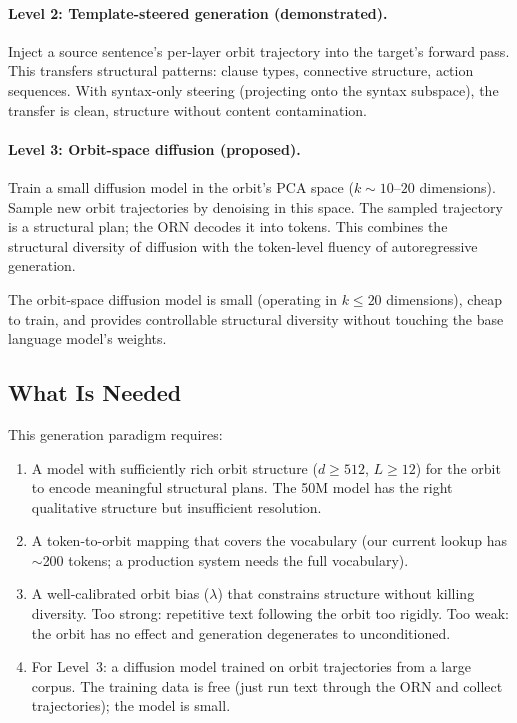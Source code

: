 \documentclass[11pt, a4paper]{article}
\theoremstyle{plain}
\theoremstyle{definition}
\theoremstyle{remark}
\begin{document}
\paragraph{Level 2: Template-steered generation (demonstrated).}
Inject a source sentence's per-layer orbit trajectory into the target's forward pass.
This transfers structural patterns: clause types, connective structure, action sequences.
With syntax-only steering (projecting onto the syntax subspace), the transfer is clean, structure without content contamination.

\paragraph{Level 3: Orbit-space diffusion (proposed).}
Train a small diffusion model in the orbit's PCA space ($k \sim 10$--$20$ dimensions).
Sample new orbit trajectories by denoising in this space.
The sampled trajectory is a structural plan; the ORN decodes it into tokens.
This combines the structural diversity of diffusion with the token-level fluency of autoregressive generation.

The orbit-space diffusion model is small (operating in $k \leq 20$ dimensions), cheap to train, and provides controllable structural diversity without touching the base language model's weights.

\subsection{What Is Needed}

This generation paradigm requires:
\begin{enumerate}[nosep]
\item A model with sufficiently rich orbit structure ($d \geq 512$, $L \geq 12$) for the orbit to encode meaningful structural plans.
    The 50M model has the right qualitative structure but insufficient resolution.
\item A token-to-orbit mapping that covers the vocabulary (our current lookup has $\sim$200 tokens; a production system needs the full vocabulary).
\item A well-calibrated orbit bias ($\lambda$) that constrains structure without killing diversity.
    Too strong: repetitive text following the orbit too rigidly.
    Too weak: the orbit has no effect and generation degenerates to unconditioned.
\item For Level~3: a diffusion model trained on orbit trajectories from a large corpus.
    The training data is free (just run text through the ORN and collect trajectories); the model is small.
\end{enumerate}
\end{document}
